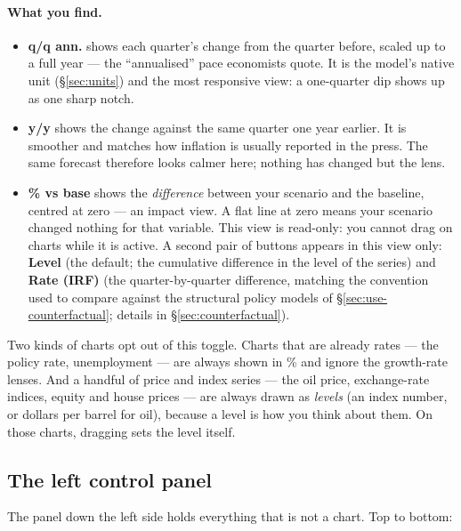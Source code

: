 \documentclass[11pt]{article}
\theoremstyle{definition}
\theoremstyle{remark}
\begin{document}
\paragraph{What you find.}
\begin{itemize}
  \item \textbf{q/q ann.} shows each quarter's change from the quarter before, scaled up to a
    full year --- the ``annualised'' pace economists quote. It is the model's native unit
    (\S\ref{sec:units}) and the most responsive view: a one-quarter dip shows up as one sharp
    notch.
  \item \textbf{y/y} shows the change against the same quarter one year earlier. It is
    smoother and matches how inflation is usually reported in the press. The same forecast
    therefore looks calmer here; nothing has changed but the lens.
  \item \textbf{\% vs base} shows the \emph{difference} between your scenario and the
    baseline, centred at zero --- an impact view. A flat line at zero means your scenario
    changed nothing for that variable. This view is read-only: you cannot drag on charts while
    it is active. A second pair of buttons appears in this view only: \textbf{Level} (the
    default; the cumulative difference in the level of the series) and \textbf{Rate (IRF)}
    (the quarter-by-quarter difference, matching the convention used to compare against the
    structural policy models of \S\ref{sec:use-counterfactual}; details in
    \S\ref{sec:counterfactual}).
\end{itemize}

Two kinds of charts opt out of this toggle. Charts that are already rates --- the policy rate,
unemployment --- are always shown in \% and ignore the growth-rate lenses. And a handful
of price and index series --- the oil price, exchange-rate indices, equity and house prices ---
are always drawn as \emph{levels} (an index number, or dollars per barrel for oil), because a
level is how you think about them. On those charts, dragging sets the level itself.

\subsection{The left control panel}

The panel down the left side holds everything that is not a chart. Top to bottom:
\end{document}
